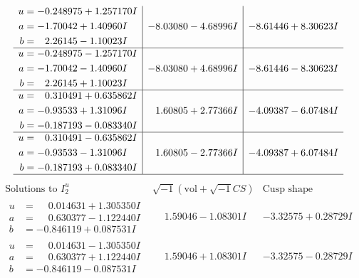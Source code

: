 \documentclass[1p]{elsarticle_modified}
\theoremstyle{definition}
\newcommand{\I}{\sqrt{-1}}
\begin{document}
$$\begin{array}{c|c|c}
\begin{aligned}
u &= -0.248975 + 1.257170 I \\
a &= -1.70042 + 1.40960 I \\
b &= \phantom{-}2.26145 - 1.10023 I\end{aligned}
 & -8.03080 - 4.68996 I & -8.61446 + 8.30623 I \\ \hline\begin{aligned}
u &= -0.248975 - 1.257170 I \\
a &= -1.70042 - 1.40960 I \\
b &= \phantom{-}2.26145 + 1.10023 I\end{aligned}
 & -8.03080 + 4.68996 I & -8.61446 - 8.30623 I \\ \hline\begin{aligned}
u &= \phantom{-}0.310491 + 0.635862 I \\
a &= -0.93533 + 1.31096 I \\
b &= -0.187193 - 0.083340 I\end{aligned}
 & \phantom{-}1.60805 + 2.77366 I & -4.09387 - 6.07484 I \\ \hline\begin{aligned}
u &= \phantom{-}0.310491 - 0.635862 I \\
a &= -0.93533 - 1.31096 I \\
b &= -0.187193 + 0.083340 I\end{aligned}
 & \phantom{-}1.60805 - 2.77366 I & -4.09387 + 6.07484 I\\
 \hline 
 \end{array}$$\newpage$$\begin{array}{c|c|c}  
\text{Solutions to }I^u_{2}& \I (\text{vol} + \sqrt{-1}CS) & \text{Cusp shape}\\
 \hline 
\begin{aligned}
u &= \phantom{-}0.014631 + 1.305350 I \\
a &= \phantom{-}0.630377 - 1.122440 I \\
b &= -0.846119 + 0.087531 I\end{aligned}
 & \phantom{-}1.59046 - 1.08301 I & -3.32575 + 0.28729 I \\ \hline\begin{aligned}
u &= \phantom{-}0.014631 - 1.305350 I \\
a &= \phantom{-}0.630377 + 1.122440 I \\
b &= -0.846119 - 0.087531 I\end{aligned}
 & \phantom{-}1.59046 + 1.08301 I & -3.32575 - 0.28729 I \\ \hline\begin{aligned}

\end{aligned}
\end{array}$$
\end{document}

